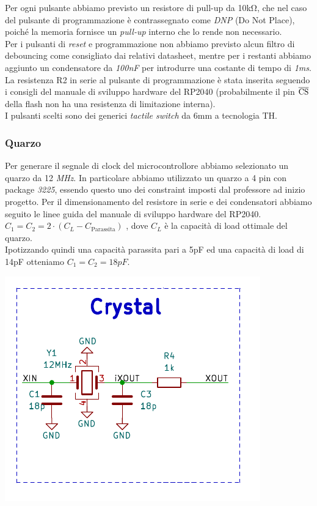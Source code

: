 \noindent Per ogni pulsante abbiamo previsto un resistore di pull-up da 10kΩ, che
nel caso del pulsante di programmazione è contrassegnato come \emph{DNP}
(Do Not Place), poiché la memoria fornisce un \emph{pull-up} interno che
lo rende non necessario.\\
Per i pulsanti di \emph{reset} e programmazione non abbiamo previsto
alcun filtro di debouncing come consigliato dai relativi datasheet,
mentre per i restanti abbiamo aggiunto un condensatore da \emph{100nF}
per introdurre una costante di tempo di \emph{1ms}.\\
La resistenza R2 in serie al pulsante di programmazione è stata inserita
seguendo i consigli del manuale di sviluppo hardware del RP2040
(probabilmente il pin $\overline{\rm {CS}}$ della flash non ha una
resistenza di limitazione interna).\\
I pulsanti scelti sono dei generici \emph{tactile switch} da 6mm a
tecnologia TH.

\hypertarget{quarzo}{%
\subsubsection{Quarzo}\label{quarzo}}

Per generare il segnale di clock del microcontrollore abbiamo
selezionato un quarzo da 12 \emph{MHz}. In particolare abbiamo
utilizzato un quarzo a 4 pin con package \emph{3225}, essendo questo uno
dei constraint imposti dal professore ad inizio progetto. Per il
dimensionamento del resistore in serie e dei condensatori abbiamo
seguito le linee guida del manuale di sviluppo hardware del RP2040.\\
\(C_{1} = C_{2} = 2 \cdot (C_{L} - C_{\text{Parassita}})\)
, dove \(C_{L}\) è la capacità di load ottimale del quarzo.\\
Ipotizzando quindi una capacità parassita pari a 5pF ed una capacità di
load di 14pF otteniamo \(C_{1} = C_{2} =18pF\).

\begin{center}
\includegraphics[scale=0.8]{figures/image76.png}
\captionsetup{type=figure}
\end{center}

